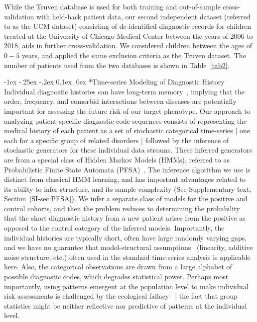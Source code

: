 \documentclass[onecolumn,,10pt]{IEEEtran}
\makeatletter
\renewcommand\subsection{\@startsection {section}{1}{\z@}%
  {-1ex \@plus -.25ex \@minus -.2ex}%
  {0.1ex \@plus.0ex}%
  {\fontsize{11}{12}\selectfont\bfseries\sffamily\color{DodgerBlue4}}}
\def\treatment{positive\xspace}
\makeatother
\begin{document}
While the Truven database is used for both training and out-of-sample cross-validation with held-back patient data, our second independent dataset (referred to as the UCM dataset) consisting of de-identified diagnostic records for children treated at the University of Chicago Medical Center between the years of 2006 to 2018, aids in further cross-validation. We considered children between the ages of $0-5$ years, and  applied the same exclusion criteria as the Truven dataset.
The  number of  patients used from the two databases is shown in Table~\ref{tab2}.

\subsection*{Time-series Modeling of  Diagnostic History}
Individual diagnostic histories  can have long-term memory~\cite{ltgranger80}, implying that the order, frequency, and comorbid interactions between diseases are potentially  important for assessing the future risk of our target phenotype. 
Our  approach to analyzing patient-specific  diagnostic code sequences consists of representing the medical history of each patient as a set of stochastic categorical time-series | one each for a specific group of related disorders |  followed by the inference of stochastic generators  for  these individual data streams. These inferred generators are from a special class of  Hidden Markov Models (HMMs), referred to as Probabilistic Finite State Automata (PFSA)~\cite{CL12g}. The inference algorithm we use is distinct from classical HMM learning, and has important advantages related to its ability to infer structure, and its sample complexity (See Supplementary text, Section~\ref{SI-sec:PFSA}). We infer a separate class of models for the \treatment and control cohorts, and then the problem reduces to determining the probability that the short diagnostic history from a  new  patient arises from the \treatment as opposed to the control category of the inferred models. Importantly,  the individual histories are typically short, often have large randomly varying  gaps, and we have no guarantee that model-structural assumptions~\cite{Stoyanov2010,Shumway2000} (linearity, additive noise structure, etc.)  often used in the standard time-series analysis is applicable here. Also, the categorical observations are drawn  from a large alphabet of possible  diagnostic codes, which degrades  statistical power. Perhaps most importantly,   using patterns emergent at the population level to make individual risk assessments is challenged by the  ecological fallacy~\cite{freedman04,rao92,bendel90} | the  fact that group statistics might be neither  reflective nor predictive   of patterns at the individual level.
\end{document}

